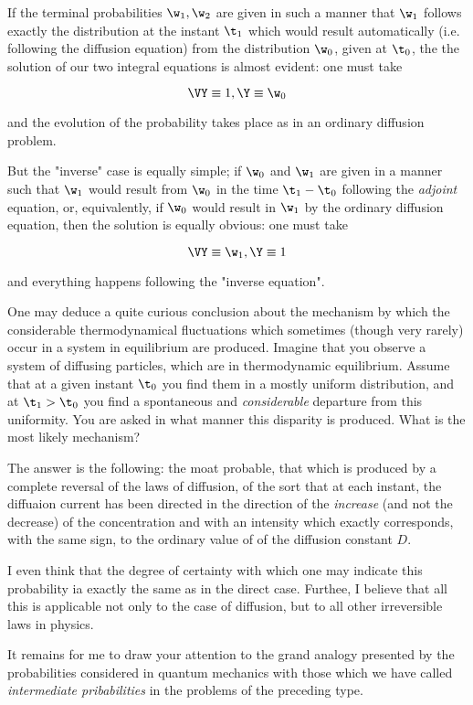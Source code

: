 \documentclass{article}
\newcommand{\uequ}[1]{
\begin{equation*}
#1
\end{equation*}
}
\newcommand{\const}[1]{#1}
\renewcommand{\it}[1]{\textit{#1}}
\begin{document}
If the terminal probabilities $\w_1, \w_2$ are given in such a manner that $\w_1$ follows exactly the distribution at the instant $\t_1$ which would result automatically (i.e. following the diffusion equation) from the distribution $\w_0$, given at $\t_0$, the the solution of our two integral equations is almost evident: one must take
\uequ{
\VY \equiv 1, \Y \equiv \w_0
}
and the evolution of the probability takes place as in an ordinary diffusion problem.

But the "inverse" case is equally simple; if $\w_0$ and $\w_1$ are given in a manner such that $\w_1$ would result from $\w_0$ in the time $\t_1 - \t_0$ following the \it{adjoint} equation, or, equivalently, if $\w_0$ would result in $\w_1$ by the ordinary diffusion equation, then the solution is equally obvious: one must take
\uequ{
\VY \equiv \w_1, \Y \equiv 1
}
and everything happens following the "inverse equation".

One may deduce a quite curious conclusion about the mechanism by which the considerable thermodynamical fluctuations which sometimes (though very rarely) occur in a system in equilibrium are produced. Imagine that you observe a system of diffusing particles, which are in thermodynamic equilibrium. Assume that at a given instant $\t_0$ you find them in a mostly uniform distribution, and at $\t_1 > \t_0$ you find a spontaneous and \it{considerable} departure from this uniformity. You are asked in what manner this disparity is produced. What is the most likely mechanism?

The answer is the following: the moat probable, that which is produced by a complete reversal of the laws of diffusion, of the sort that at each instant, the diffuaion current has been directed in the direction of the \it{increase} (and not the decrease) of the concentration and with an intensity which exactly corresponds, with the same sign, to the ordinary value of of the diffusion constant $\const{D}$.

I even think that the degree of certainty with which one may indicate this probability ia exactly the same as in the direct case. Furthee, I believe that all this is applicable not only to the case of diffusion, but to all other irreversible laws in physics.

It remains for me to draw your attention to the grand analogy presented by the probabilities considered in quantum mechanics with those which we have called \it{intermediate pribabilities} in the problems of the preceding type.
\end{document}
